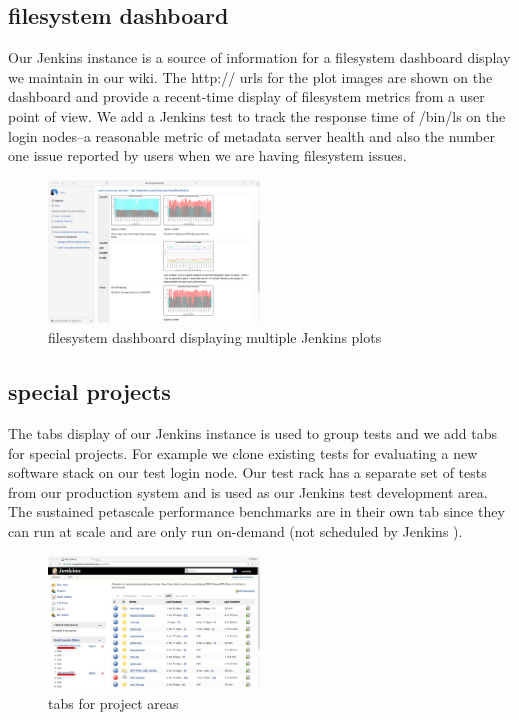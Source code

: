 \documentclass[10pt, conference, compsocconf]{IEEEtran}
\begin{document}
\subsection{filesystem dashboard}
Our Jenkins instance is a source of information for a filesystem dashboard display we maintain in our wiki.  The http:// urls for the plot images are shown on the dashboard and provide a recent-time display of filesystem metrics from a user point of view.  We add a Jenkins test to track the response time of /bin/ls on the login nodes--a reasonable metric of metadata server health and also the number one issue reported by users when we are having filesystem issues.
\begin{figure}[H]
\centering
\includegraphics[width=0.5\textwidth]{wiki-dashboard}
\caption{ filesystem dashboard displaying multiple Jenkins plots }
\label{fig:wiki-dashboard}
\end{figure}

\subsection{special projects}
The tabs display of our Jenkins instance is used to group tests and we add tabs for special projects.   For example we clone existing tests for evaluating a new software stack on our test login node.   Our test rack has a separate set of tests from our production system and is used as our Jenkins test development area.  The sustained petascale performance benchmarks are in their own tab since they can run at scale and are only run on-demand (not scheduled by Jenkins ).
\begin{figure}[H]
\centering
\includegraphics[width=0.5\textwidth]{tabs-display}
\caption{ tabs for project areas }
\label{fig:tabs-display}
\end{figure}
\end{document}
